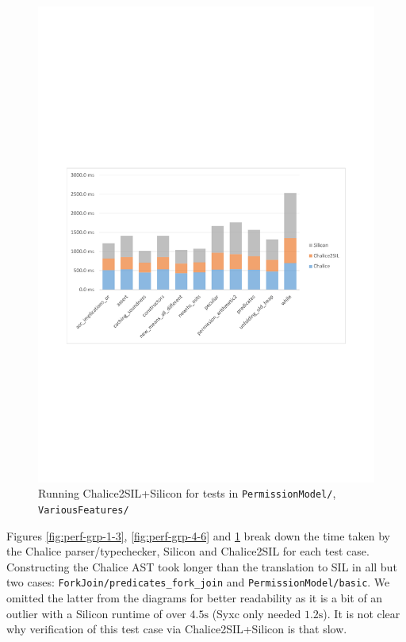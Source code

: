 \begin{figure}
\includegraphics[width=145mm]{src/data/groups-7-8.pdf}
\caption{Running Chalice2SIL+Silicon for tests in \texttt{PermissionModel/}, \texttt{VariousFeatures/}}\label{fig:perf-grp-7-8}
\end{figure}

Figures \ref{fig:perf-grp-1-3}, \ref{fig:perf-grp-4-6} and \ref{fig:perf-grp-7-8} break down the time taken by the Chalice parser/typechecker, Silicon and Chalice2SIL for each test case. 
Constructing the Chalice AST took longer than the translation to SIL in all but two cases: \texttt{ForkJoin/predicates_fork_join} and  \texttt{PermissionModel/basic}.
We omitted the latter from the diagrams for better readability as it is a bit of an outlier with a Silicon runtime of over $4.5\text{s}$ (Syxc only needed $1.2\text{s}$).
It is not clear why verification of this test case via Chalice2SIL+Silicon is that slow. 


